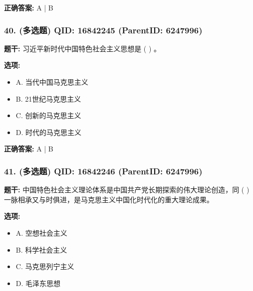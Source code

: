 \documentclass[12pt,UTF8]{ctexart}
\begin{document}
\textbf{正确答案:}
A | B

\vspace{0.3em}\hrulefill\vspace{0.7em}

\subsubsection*{40. (多选题) \small QID: 16842245 (ParentID: 6247996)}

\textbf{题干:}
习近平新时代中国特色社会主义思想是 ( ) 。



\textbf{选项:}
\begin{itemize}[leftmargin=*]

  \item A. 当代中国马克思主义

  \item B. 21世纪马克思主义

  \item C. 创新的马克思主义

  \item D. 时代的马克思主义

\end{itemize}

\textbf{正确答案:}
A | B

\vspace{0.3em}\hrulefill\vspace{0.7em}

\subsubsection*{41. (多选题) \small QID: 16842246 (ParentID: 6247996)}

\textbf{题干:}
中国特色社会主义理论体系是中国共产党长期探索的伟大理论创造，同 ( ) 一脉相承又与时俱进，是马克思主义中国化时代化的重大理论成果。



\textbf{选项:}
\begin{itemize}[leftmargin=*]

  \item A. 空想社会主义

  \item B. 科学社会主义

  \item C. 马克思列宁主义

  \item D. 毛泽东思想

\end{itemize}
\end{document}
